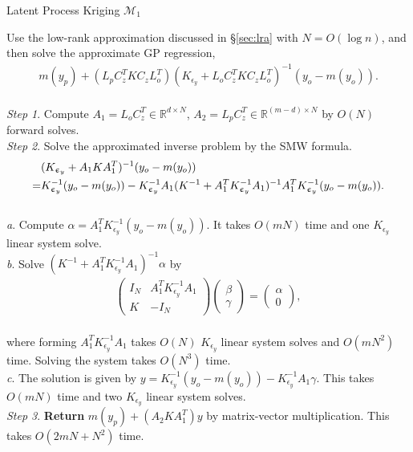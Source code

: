 \documentclass[article,ij4uq]{ij4uq}              %
\begin{document}
\begin{algorithm}[!t]
\caption{Latent Process Kriging $\mathcal{M}_{1}$}\label{alg:1}
Use the low-rank approximation discussed in \S \ref{sec:lra} with $N=O(\log{n})$, and then solve the approximate GP regression,
\begin{align}
    m(y_{p})+(L_{p}C_{z}^{T}KC_{z}L_{o}^{T})(K_{\epsilon_{y}}+L_{o}C_{z}^{T}KC_{z}L_{o}^{T})^{-1}(y_{o}-m(y_{o})).\label{eq20}
\end{align}\\
    \textit{Step 1}. Compute $A_{1}=L_{o}C_{z}^{T}\in\mathbb{R}^{d\times N}$, $A_{2}=L_{p}C_{z}^{T}\in\mathbb{R}^{(m-d)\times N}$ by $O(N)$ forward solves.\\
    \textit{Step 2}. Solve the approximated inverse problem by the SMW formula. 
    \begin{align}
        &(K_{\epsilon_{y}}+A_{1}KA_{1}^{T})^{-1}(y_{o}-m(y_{o}))\notag\\
        =&K_{\epsilon_{y}}^{-1}(y_{o}-m(y_{o}))-K_{\epsilon_{y}}^{-1}A_{1}(K^{-1}+A_{1}^{T}K_{\epsilon_{y}}^{-1}A_{1})^{-1}A_{1}^{T}K_{\epsilon_{y}}^{-1}(y_{o}-m(y_{o})).\label{eq21}
    \end{align}\\
        \quad\quad\textit{a}. Compute $\alpha=A_{1}^{T}K_{\epsilon_{y}}^{-1}(y_{o}-m(y_{o}))$. It takes $O(mN)$ time and one $K_{\epsilon_{y}}$ linear system solve.\\
        \quad\quad\textit{b}. Solve $(K^{-1}+A_{1}^{T}K_{\epsilon_{y}}^{-1}A_{1})^{-1}\alpha$ by
\begin{align}
    \begin{pmatrix}I_{N} & A_{1}^{T}K_{\epsilon_{y}}^{-1}A_{1}\\K & -I_{N}\end{pmatrix}\begin{pmatrix}\beta\\\gamma\end{pmatrix}=\begin{pmatrix}\alpha\\0\end{pmatrix},\label{eq22}
\end{align}\\
\quad\quad where forming $A_{1}^{T}K_{\epsilon_{y}}^{-1}A_{1}$ takes $O(N)$ $K_{\epsilon_{y}}$ linear system solves and $O(mN^{2})$ time. Solving the system takes $O(N^{3})$ time.\\
        \quad\quad\textit{c}. The solution is given by $y=K_{\epsilon_{y}}^{-1}(y_{o}-m(y_{o}))-K_{\epsilon_{y}}^{-1}A_{1}\gamma$. This takes $O(mN)$ time and two $K_{\epsilon_{y}}$ linear system solves.\\
\textit{Step 3}. \textbf{Return} $m(y_{p})+(A_{2}KA_{1}^{T})y$ by matrix-vector multiplication. This takes $O(2mN+N^{2})$ time.
\end{algorithm}
\end{document}
